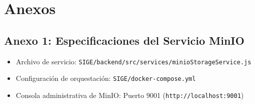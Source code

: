 \documentclass[12pt,a4paper]{article}
\begin{document}
\vspace{0.4cm}

\section{Anexos}
\subsection*{Anexo 1: Especificaciones del Servicio MinIO}
\begin{itemize}[leftmargin=1.5em, itemsep=1.5pt]
    \item Archivo de servicio: \texttt{SIGE/backend/src/services/minioStorageService.js}
    \item Configuración de orquestación: \texttt{SIGE/docker-compose.yml}
    \item Consola administrativa de MinIO: Puerto 9001 (\texttt{http://localhost:9001})
\end{itemize}
\end{document}
